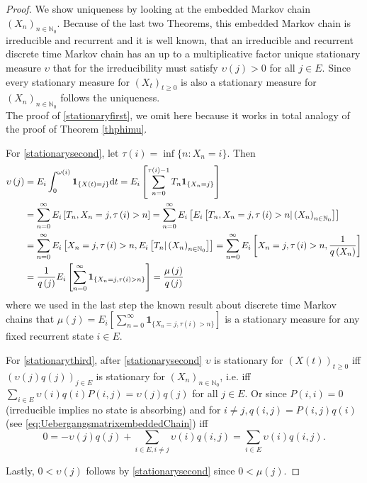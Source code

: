\documentclass[12pt,a4paper]{scrartcl}
\numberwithin{equation}{section}
\newcommand{\N}{\mathbb{N}} %
\begin{document}
\begin{proof}
We show uniqueness by looking at the embedded Markov chain $\left(X_n\right)_{n \in \N_0}$. Because of the last two Theorems, this embedded Markov chain is irreducible and recurrent and it is well known, that an irreducible and recurrent discrete time Markov chain has an up to a multiplicative factor unique stationary measure $\upsilon$ that for the irreducibility must satisfy $\upsilon\left(j\right) > 0$ for all $j \in E.$  Since every stationary measure for $\left(X_t\right)_{t \geq 0}$ is also a stationary measure for $\left(X_n\right)_{n \in \N_0}$ follows the uniqueness.\\

The proof of \eqref{stationaryfirst}, we omit here because it works in total analogy of the proof of Theorem \ref{thphimu}. 

For \eqref{stationarysecond}, let $ \tau\left(i\right) = \inf \lbrace n : X_n = i \rbrace $. Then
\begin{align*}
\upsilon\left(j\right) &= E_i \int_0^{\omega\left(i\right)} \textbf{1}_{\lbrace X\left(t\right) = j \rbrace} \textnormal{d} t = E_i\left[ \sum_{n=0}^{\tau\left(i\right)- 1} T_n \textbf{1}_{\lbrace X_n = j \rbrace} \right] \\
&= \sum_{n=0}^{\infty} E_i\left[T_n, X_n = j, \tau\left(i\right) > n \right] = \sum_{n=0}^{\infty} E_i\left[ E_i\left[T_n, X_n = j, \tau\left(i\right) > n | \left(X_n\right)_{n \in \N_0} \right] \right] \\
&= \sum_{n=0}^{\infty} E_i\left[ X_n = j, \tau\left(i\right) > n, E_i\left[T_n | \left(X_n\right)_{n \in \N_0} \right] \right] = \sum_{n=0}^{\infty} E_i\left[ X_n = j, \tau\left(i\right) > n, \frac{1}{q\left(X_n\right)} \right] \\
&= \frac{1}{q\left(j\right)} E_i\left[\sum_{n=0}^{\infty} \textbf{1}_{\lbrace X_n = j, \tau\left(i\right) >n \rbrace}  \right] = \frac{\mu\left(j\right)}{q\left(j\right)}
\end{align*}
where we used in the last step the known result about discrete time Markov chains that $\mu\left(j\right) = E_i\left[\sum_{n=0}^{\infty} \textbf{1}_{\lbrace X_n = j, \tau\left(i\right) >n \rbrace}  \right] $ is a stationary measure for any fixed recurrent state $i \in E.$

For \eqref{stationarythird}, after \eqref{stationarysecond} $\upsilon$ is stationary for $\left(X\left(t\right)\right)_{t \geq 0}$ iff $\left(\upsilon\left(j\right) q\left(j\right) \right)_{j \in E}$ is stationary for $\left(X_n \right)_{n \in \N_0}$, i.e. iff $ \sum_{i \in E} \upsilon\left(i\right) q\left(i\right) P\left(i,j\right) = \upsilon\left(j\right) q\left(j\right)$ for all $j \in E$. Or since $P\left(i,i\right) = 0$ (irreducible implies no state is absorbing) and for $i\neq j, q\left(i,j\right) = P\left(i,j\right) q\left(i\right)$ (see \eqref{eq:UebergangsmatrixembeddedChain}) iff
$$ 0 = -\upsilon\left(j\right)q\left(j\right) + \sum_{i \in E, i \neq j} \upsilon\left(i\right) q\left(i,j\right) = \sum_{i \in E} \upsilon\left(i\right) q\left(i,j\right). $$

Lastly, $0 < \upsilon\left(j\right) $ follows by \eqref{stationarysecond} since $0 < \mu\left(j\right).$
\end{proof}
\end{document}
